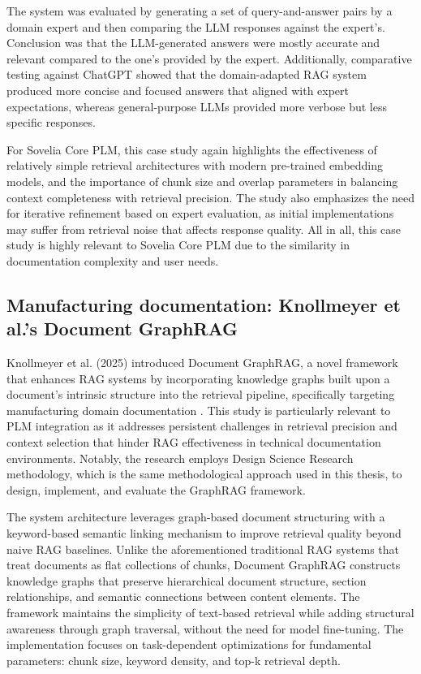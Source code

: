 The system was evaluated by generating a set of query-and-answer pairs by a domain expert and then comparing the LLM responses against the expert's. Conclusion was that the LLM-generated answers were mostly accurate and relevant compared to the one's provided by the expert. Additionally, comparative testing against ChatGPT showed that the domain-adapted RAG system produced more concise and focused answers that aligned with expert expectations, whereas general-purpose LLMs provided more verbose but less specific responses.

For Sovelia Core PLM, this case study again highlights the effectiveness of relatively simple retrieval architectures with modern pre-trained embedding models, and the importance of chunk size and overlap parameters in balancing context completeness with retrieval precision. The study also emphasizes the need for iterative refinement based on expert evaluation, as initial implementations may suffer from retrieval noise that affects response quality. All in all, this case study is highly relevant to Sovelia Core PLM due to the similarity in documentation complexity and user needs.

\subsection*{Manufacturing documentation: Knollmeyer et al.'s Document GraphRAG}

Knollmeyer et al. (2025) introduced Document GraphRAG, a novel framework that enhances RAG systems by incorporating knowledge graphs built upon a document's intrinsic structure into the retrieval pipeline, specifically targeting manufacturing domain documentation \parencite{knollmeyer_document_2025}. This study is particularly relevant to PLM integration as it addresses persistent challenges in retrieval precision and context selection that hinder RAG effectiveness in technical documentation environments. Notably, the research employs Design Science Research methodology, which is the same methodological approach used in this thesis, to design, implement, and evaluate the GraphRAG framework.

The system architecture leverages graph-based document structuring with a keyword-based semantic linking mechanism to improve retrieval quality beyond naive RAG baselines. Unlike the aforementioned traditional RAG systems that treat documents as flat collections of chunks, Document GraphRAG constructs knowledge graphs that preserve hierarchical document structure, section relationships, and semantic connections between content elements. The framework maintains the simplicity of text-based retrieval while adding structural awareness through graph traversal, without the need for model fine-tuning. The implementation focuses on task-dependent optimizations for fundamental parameters: chunk size, keyword density, and top-k retrieval depth. \parencite{knollmeyer_document_2025}

